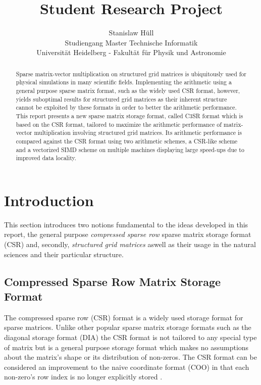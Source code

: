 \documentclass{article}
\author{Stanislaw Hüll\\\small{Studiengang Master Technische Informatik}\\\small{Universität Heidelberg - Fakultät für Physik und Astronomie}}
\title{Student Research Project}
\begin{document}
\maketitle

\begin{abstract}
Sparse matrix-vector multiplication on structured grid matrices is ubiquitously used for physical simulations in many scientific fields. Implementing the arithmetic using a general purpose sparse matrix format, such as the widely used CSR format, however, yields suboptimal results for structured grid matrices as their inherent structure cannot be exploited by these formats in order to better the arithmetic performance. This report presents a new sparse matrix storage format, called C3SR format which is based on the CSR format, tailored to maximize the arithmetic performance of matrix-vector multiplication involving structured grid matrices. Its arithmetic performance is compared against the CSR format using two arithmetic schemes, a CSR-like scheme and a vectorized SIMD scheme on multiple machines displaying large speed-ups due to improved data locality.
\end{abstract}

\newpage
\tableofcontents
\newpage
\listoffigures
\newpage
\section{Introduction}

  This section introduces two notions fundamental to the ideas developed in this report, the general purpose \emph{compressed sparse row} sparse matrix storage format (CSR) and, secondly, \emph{structured grid matrices} aswell as their usage in the natural sciences and their particular structure.

  \subsection{Compressed Sparse Row Matrix Storage Format}

    The compressed sparse row (CSR) format is a widely used storage format for sparse matrices. Unlike other popular sparse matrix storage formats such as the diagonal storage format (DIA) the CSR format is not tailored to any special type of matrix but is a general purpose storage format which makes no assumptions about the matrix's shape or its distribution of non-zeros. The CSR format can be considered an improvement to the naive coordinate format (COO) in that each non-zero's row index is no longer explicitly stored \cite{Bell2011}.
\end{document}
